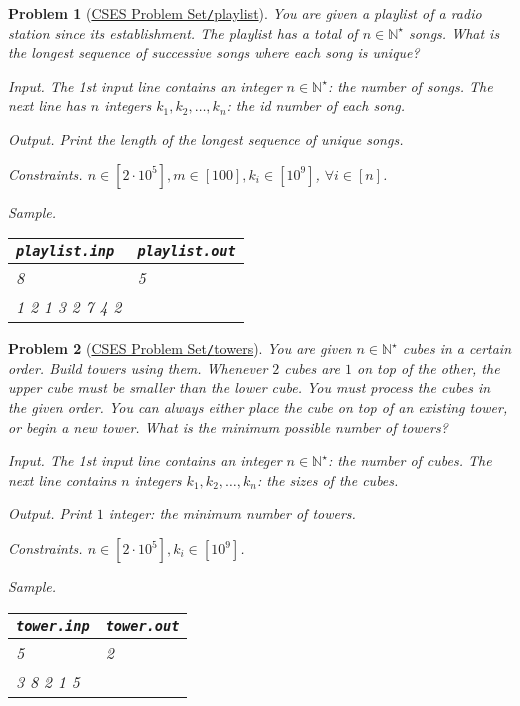 \documentclass{article}
\newtheorem{problem}{Problem}
\begin{document}
\begin{problem}[\href{https://cses.fi/problemset/task/1141}{CSES Problem Set{\tt/}playlist}]
    You are given a playlist of a radio station since its establishment. The playlist has a total of $n\in\mathbb{N}^\star$ songs. What is the longest sequence of successive songs where each song is unique?
    \item {\sf Input.} The 1st input line contains an integer $n\in\mathbb{N}^\star$: the number of songs. The next line has $n$ integers $k_1,k_2,\ldots,k_n$: the id number of each song.
    \item {\sf Output.} Print the length of the longest sequence of unique songs.
    \item {\sf Constraints.} $n\in[2\cdot10^5],m\in[100],k_i\in[10^9]$, $\forall i\in[n]$.
    \item {\sf Sample.}
    \begin{table}[H]
        \centering
        \begin{tabular}{|l|l|}
            \hline
            \verb|playlist.inp| & \verb|playlist.out| \\
            \hline
            8 & 5 \\
            1 2 1 3 2 7 4 2 & \\
            \hline
        \end{tabular}
    \end{table}
\end{problem}

\begin{problem}[\href{https://cses.fi/problemset/task/1073}{CSES Problem Set{\tt/}towers}]
    You are given $n\in\mathbb{N}^\star$ cubes in a certain order. Build towers using them. Whenever $2$ cubes are $1$ on top of the other, the upper cube must be smaller than the lower cube. You must process the cubes in the given order. You can always either place the cube on top of an existing tower, or begin a new tower. What is the minimum possible number of towers?
    \item {\sf Input.} The 1st input line contains an integer $n\in\mathbb{N}^\star$: the number of cubes. The next line contains $n$ integers $k_1,k_2,\ldots,k_n$: the sizes of the cubes.
    \item {\sf Output.} Print $1$ integer: the minimum number of towers.
    \item {\sf Constraints.} $n\in[2\cdot10^5],k_i\in[10^9]$.
    \item {\sf Sample.}
    \begin{table}[H]
        \centering
        \begin{tabular}{|l|l|}
            \hline
            \verb|tower.inp| & \verb|tower.out| \\
            \hline
            5 & 2 \\
            3 8 2 1 5 & \\
            \hline
        \end{tabular}
    \end{table}
\end{problem}
\end{document}

